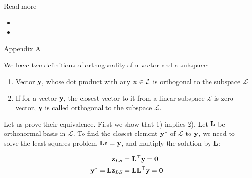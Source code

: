 \documentclass{beamer}
\begin{document}
\begin{frame}{Read more}
	\begin{flushleft}
		
		\begin{itemize}
			\item {}
			
			\item {}
			
			
			
		\end{itemize}
		
		
	\end{flushleft}
\end{frame}



\myqrframe



\begin{frame}{Appendix A}
	\begin{flushleft}
		
		We have two definitions of orthogonality of a vector and a subspace:
		
		\begin{enumerate}
			\item Vector $\mathbf{y}$, whose dot product with any $\mathbf{x} \in \mathcal{L}$ is orthogonal to the subspace $\mathcal{L}$
			
			\item If for a vector $\mathbf{y}$, the closest vector to it from a linear subspace $\mathcal{L}$ is zero vector, $\mathbf{y}$ is called orthogonal to the subspace $\mathcal{L}$.
		\end{enumerate}
		
	Let us prove their equivalence. First we show that 1) implies 2). Let $\mathbf{L}$ be orthonormal basis in $\mathcal{L}$. To find the closest element $\mathbf{y}^*$ of $\mathcal{L}$ to $\mathbf{y}$, we need to solve the least squares problem $\mathbf{L}\mathbf{z} = \mathbf{y}$, and multiply the solution by $\mathbf{L}$:
	
	\begin{align}
		\mathbf{z}_{LS} &= \mathbf{L}^\top \mathbf{y} = \mathbf{0} \\
    	\mathbf{y}^* = \mathbf{L}\mathbf{z}_{LS} &= \mathbf{L}\mathbf{L}^\top \mathbf{y} = \mathbf{0}
	\end{align}		
		
	\end{flushleft}
\end{frame}
\end{document}
